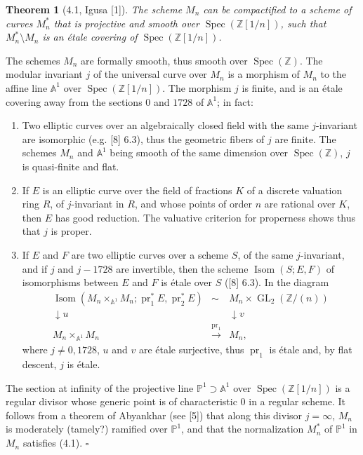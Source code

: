 \documentclass[10pt]{article}
\newcommand{\Z}{\mathbb Z}
\newcommand{\GL}{\operatorname{GL}}
\newcommand{\Isom}{\operatorname{Isom}}
\newcommand{\Spec}{\operatorname{Spec}}
\newcommand{\QED}{\hfill$\square$}
\newtheorem*{theorem}{Theorem}
\begin{document}
\begin{theorem}[4.1, Igusa {\rm [1]}]
The scheme $M_n$ can be compactified to a scheme of curves $M_n^*$ that is projective and smooth over $\Spec(\Z[1/n])$, such that $M_n^*\setminus M_n$ is an étale covering of $\Spec(\Z[1/n])$.
\end{theorem}

The schemes $M_n$ are formally smooth, thus smooth over $\Spec(\Z)$. The modular invariant $j$ of the universal curve over $M_n$ is a morphism of $M_n$ to the affine line $\mathbb A^1$ over $\Spec(\Z[1/n])$. The morphism $j$ is finite, and is an étale covering away from the sections $0$ and $1728$ of $\mathbb A^1$; in fact:
\begin{enumerate}[label=(\alph*)]
\item Two elliptic curves over an algebraically closed field with the same $j$-invariant are isomorphic (e.g. [8] 6.3), thus the geometric fibers of $j$ are finite. The schemes $M_n$ and $\mathbb A^1$ being smooth of the same dimension over $\Spec(\Z)$, $j$ is quasi-finite and flat.
\item If $E$ is an elliptic curve over the field of fractions $K$ of a discrete valuation ring $R$, of $j$-invariant in $R$, and whose points of order $n$ are rational over $K$, then $E$ has good reduction. The valuative criterion for properness shows thus that $j$ is proper.
\item If $E$ and $F$ are two elliptic curves over a scheme $S$, of the same $j$-invariant, and if $j$ and $j-1728$ are invertible, then the scheme $\Isom(S;E,F)$ of isomorphisms between $E$ and $F$ is étale over $S$ ([8] 6.3). In the diagram
\[
\begin{array}{ccc}
\Isom(M_n\times_{\mathbb A^1}M_n;\operatorname{pr}_1^*E,\operatorname{pr}_2^*E) & \sim & M_n\times \GL_2(\Z/(n))\\
\downarrow u && \downarrow v\\
M_n\times_{\mathbb A^1}M_n&\xrightarrow{\operatorname{pr}_1}&M_n,
\end{array}
\]
where $j\ne 0,1728$, $u$ and $v$ are étale surjective, thus $\operatorname{pr}_1$ is étale and, by flat descent, $j$ is étale.
\end{enumerate}
The section at infinity of the projective line $\mathbb P^1\supset \mathbb A^1$ over $\Spec(\Z[1/n])$ is a regular divisor whose generic point is of characteristic $0$ in a regular scheme. It follows from a theorem of Abyankhar (see [5]) that along this divisor $j=\infty$, $M_n$ is moderately (tamely?) ramified over $\mathbb P^1$, and that the normalization $M_n^*$ of $\mathbb P^1$ in $M_n$ satisfies (4.1). \QED
\end{document}
